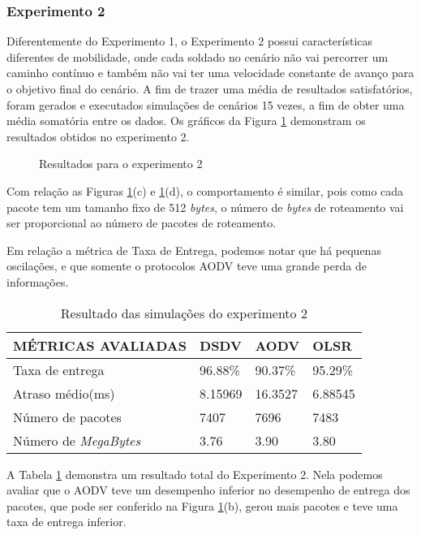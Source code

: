 \subsubsection{Experimento 2}
Diferentemente do Experimento 1, o Experimento 2 possui caracter\'isticas diferentes de mobilidade, onde cada soldado no cen\'ario n\~ao vai percorrer um caminho cont\'inuo e tamb\'em n\~ao vai ter uma velocidade constante de avan\c{c}o para o objetivo final do cen\'ario.
A fim de trazer uma m\'edia de resultados satisfat\'orios, foram gerados e executados simula\c{c}\~oes de cen\'arios 15 vezes, a fim de obter uma m\'edia somat\'oria entre os dados.
Os gr\'aficos da Figura \ref{fig:resulExp2} demonstram os resultados obtidos no experimento 2.

\begin{figure}[H]
	\centering
	\label{subfig:exp2Taxa}
	\label{subfig:exp2Late}
	\label{subfig:exp2Byte}
	\label{subfig:exp2Pkts}
	
	\caption{Resultados para o experimento 2}
	\label{fig:resulExp2}
\end{figure}

Com rela\c{c}\~ao as Figuras \ref{fig:resulExp2}(c) e \ref{fig:resulExp2}(d), o comportamento \'e similar, pois como cada pacote tem um tamanho fixo de 512 \textit{bytes}, o n\'umero de \textit{bytes} de roteamento vai ser proporcional ao n\'umero de pacotes de roteamento.

Em rela\c{c}\~ao a m\'etrica de Taxa de Entrega, podemos notar que h\'a pequenas oscila\c{c}\~oes, e que somente o protocolos AODV teve uma grande perda de informa\c{c}\~oes.

\begin{table}[H]
	\centering
	\caption{Resultado das simula\c{c}\~oes do experimento 2}
	\begin{tabular}{ | l | l | l | l | }
		\hline
		M\'ETRICAS AVALIADAS & DSDV & AODV & OLSR \\ \hline
		Taxa de entrega & 96.88\% & 90.37\% & 95.29\%  \\ \hline
		Atraso m\'edio(ms) & 8.15969 & 16.3527 & 6.88545  \\ \hline
		N\'umero de pacotes & 7407 & 7696 & 7483  \\ \hline
		N\'umero de \textit{MegaBytes} & 3.76 & 3.90 & 3.80  \\ \hline
	\end{tabular}
	\label{tabExp2Result}
\end{table}

A Tabela \ref{tabExp2Result} demonstra um resultado total do Experimento 2. Nela podemos avaliar que o AODV teve um desempenho inferior no desempenho de entrega dos pacotes, que pode ser conferido na Figura \ref{fig:resulExp2}(b), gerou mais pacotes e teve uma taxa de entrega inferior.
